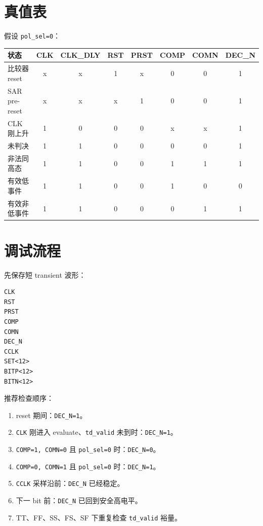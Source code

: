 \documentclass[11pt,a4paper,UTF8]{ctexart}
\begin{document}
\section{真值表}

假设 \texttt{pol\_sel=0}：

\begin{center}
\begin{tabular}{lccccccc}
\toprule
\textbf{状态} & \textbf{CLK} & \textbf{CLK\_DLY} & \textbf{RST} & \textbf{PRST} & \textbf{COMP} & \textbf{COMN} & \textbf{DEC\_N} \\
\midrule
比较器 reset & x & x & 1 & x & 0 & 0 & 1 \\
SAR pre-reset & x & x & x & 1 & 0 & 0 & 1 \\
CLK 刚上升 & 1 & 0 & 0 & 0 & x & x & 1 \\
未判决 & 1 & 1 & 0 & 0 & 0 & 0 & 1 \\
非法同高态 & 1 & 1 & 0 & 0 & 1 & 1 & 1 \\
有效低事件 & 1 & 1 & 0 & 0 & 1 & 0 & 0 \\
有效非低事件 & 1 & 1 & 0 & 0 & 0 & 1 & 1 \\
\bottomrule
\end{tabular}
\end{center}

\section{调试流程}

先保存短 transient 波形：

\begin{lstlisting}[style=va,numbers=none]
CLK
RST
PRST
COMP
COMN
DEC_N
CCLK
SET<12>
BITP<12>
BITN<12>
\end{lstlisting}

推荐检查顺序：

\begin{enumerate}
    \item reset 期间：\texttt{DEC\_N=1}。
    \item \texttt{CLK} 刚进入 evaluate、\texttt{td\_valid} 未到时：\texttt{DEC\_N=1}。
    \item \texttt{COMP=1, COMN=0} 且 \texttt{pol\_sel=0} 时：\texttt{DEC\_N=0}。
    \item \texttt{COMP=0, COMN=1} 且 \texttt{pol\_sel=0} 时：\texttt{DEC\_N=1}。
    \item \texttt{CCLK} 采样沿前：\texttt{DEC\_N} 已经稳定。
    \item 下一 bit 前：\texttt{DEC\_N} 已回到安全高电平。
    \item TT、FF、SS、FS、SF 下重复检查 \texttt{td\_valid} 裕量。
\end{enumerate}
\end{document}
